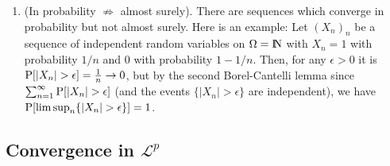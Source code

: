\documentclass[a4paper,10pt]{article}
\begin{document}
\begin{enumerate}
 \item (In probability $\not\Rightarrow$ almost surely). 
       There are sequences which converge in probability but not almost surely. Here is an example:
              Let $(X_n)_n$ be a sequence of independent random variables on $\Omega=\N$
              with $X_n=1$ with probability $1/n$ and $0$ with probability $1-1/n$.
              Then, for any $\epsilon>0$ it is $\prob[|X_n|>\epsilon]=\tfrac{1}{n}\to 0$,
              but by the second Borel-Cantelli lemma since $\sum_{n=1}^{\infty}\prob[|X_n|>\epsilon]$
              (and the events $\{|X_n|>\epsilon\}$ are independent), we have $\prob[\limsup_n \{|X_n|>\epsilon\}]=1$.
       
\end{enumerate} 
 
\subsection{Convergence in $\mathcal{L}^p$}
\end{document}
